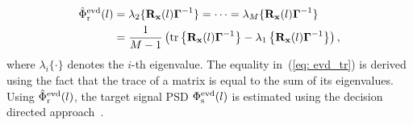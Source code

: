 \documentclass{article}
\begin{document}
\begin{subequations}
\label{eq: phir_evd}
\begin{align}
\label{eq: phir_evds}
\hat{\Phi}^{\rm evd}_{\rm r}(l) & = \lambda_2\{\mathbf{R}_{\mathbf{x}}(l)\boldsymbol{\Gamma}^{-1}\} = \cdots = \lambda_M\{\mathbf{R}_{\mathbf{x}}(l)\boldsymbol{\Gamma}^{-1}\} \\
\label{eq: evd_tr}
& =\frac{1}{M-1} \left( {\rm tr} \left\{ \mathbf{R}_{\mathbf{x}}(l)\boldsymbol{\Gamma}^{-1} \right\} - \lambda_1\left\{\mathbf{R}_{\mathbf{x}}(l)\boldsymbol{\Gamma}^{-1}\right\}\right), 
\end{align}
\end{subequations}
where $\lambda_i\{ \cdot \}$ denotes the $i$-th eigenvalue.
The equality in~(\ref{eq: evd_tr}) is derived using the fact that the trace of a matrix is equal to the sum of its eigenvalues. 
Using $\hat{\Phi}^{\rm evd}_{{\rm r}}(l)$, the target signal PSD $\Phi^{\rm evd}_{{\rm s}}(l)$ is estimated using the decision directed approach~\cite{Ephraim_ITASSP_1984}.
\end{document}
